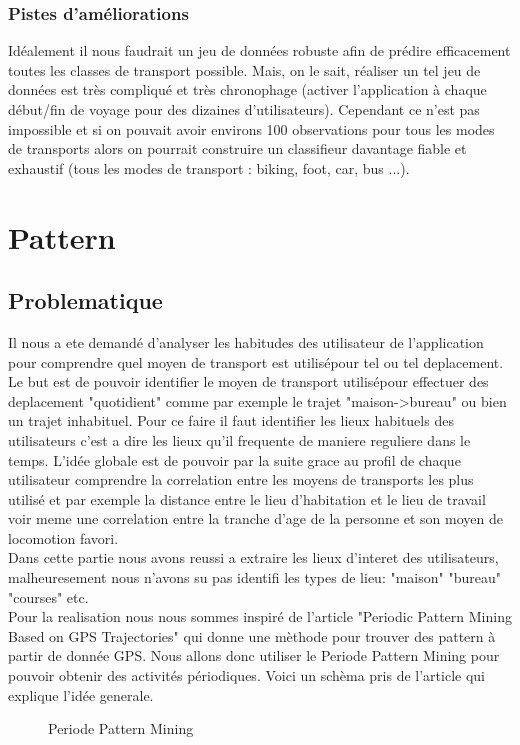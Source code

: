 \documentclass{article}
\begin{document}
\subsubsection{Pistes d'améliorations}

Idéalement il nous faudrait un jeu de données robuste afin de prédire efficacement toutes les classes de transport possible. Mais, on le sait, réaliser un tel jeu de données est très compliqué et très chronophage (activer l'application à chaque début/fin de voyage pour des dizaines d'utilisateurs).
Cependant ce n'est pas impossible et si on pouvait avoir environs 100 observations pour tous les modes de transports alors on pourrait construire un classifieur davantage fiable et exhaustif (tous les modes de transport : biking, foot, car, bus ...).


\newpage

\section{Pattern}
\subsection{Problematique}
Il nous a ete demandé d'analyser les habitudes des utilisateur de l'application pour comprendre quel moyen de transport est utilisépour tel ou tel deplacement. Le but est de pouvoir identifier le moyen de transport utilisépour effectuer des deplacement "quotidient" comme par exemple le trajet "maison->bureau" ou bien un trajet inhabituel. Pour ce faire il faut identifier les lieux habituels des utilisateurs c'est a dire les lieux qu'il frequente de maniere reguliere dans le temps. 
L'idée globale est de pouvoir par la suite grace au profil de chaque utilisateur comprendre la correlation entre les moyens de transports les plus utilisé et par exemple la distance entre le lieu d'habitation et le lieu de travail voir meme une correlation entre la tranche d'age de la personne et son moyen de locomotion favori.\\

Dans cette partie nous avons reussi a extraire les lieux d'interet des utilisateurs, malheuresement nous n'avons su pas  identifi les types de lieu: "maison" "bureau" "courses" etc.\\ 

Pour la realisation nous nous sommes inspiré de l'article "Periodic Pattern Mining Based on GPS Trajectories" qui donne une mèthode pour trouver des pattern à partir de donnée GPS. 
Nous allons donc utiliser le Periode Pattern Mining pour pouvoir obtenir des activités périodiques.
Voici un schèma pris de l'article qui explique l'idée generale.
\begin{figure}[!h]
  \centering{}
 \captionsetup{justification=centering}
    \caption{Periode Pattern Mining}
\end{figure}
\end{document}
